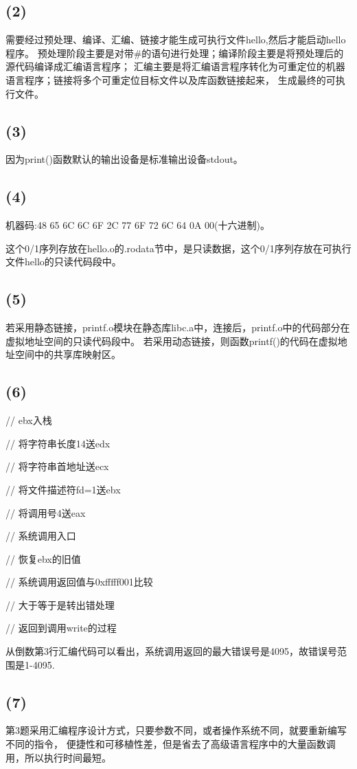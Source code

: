 \documentclass{article}
\begin{document}
\subsection*{(2)}
需要经过预处理、编译、汇编、链接才能生成可执行文件hello,然后才能启动hello程序。
预处理阶段主要是对带\#的语句进行处理；编译阶段主要是将预处理后的源代码编译成汇编语言程序；
汇编主要是将汇编语言程序转化为可重定位的机器语言程序；链接将多个可重定位目标文件以及库函数链接起来，
生成最终的可执行文件。
\subsection*{(3)}
因为print()函数默认的输出设备是标准输出设备stdout。
\subsection*{(4)}
机器码:48 65 6C 6C 6F 2C 77 6F 72 6C 64 0A 00(十六进制)。

这个0/1序列存放在hello.o的.rodata节中，是只读数据，这个0/1序列存放在可执行文件hello的只读代码段中。
\subsection*{(5)}
若采用静态链接，printf.o模块在静态库libc.a中，连接后，printf.o中的代码部分在虚拟地址空间的只读代码段中。
若采用动态链接，则函数printf()的代码在虚拟地址空间中的共享库映射区。
\subsection*{(6)}
// ebx入栈

// 将字符串长度14送edx

// 将字符串首地址送ecx

// 将文件描述符fd=1送ebx

// 将调用号4送eax

// 系统调用入口

// 恢复ebx的旧值

// 系统调用返回值与0xfffff001比较

// 大于等于是转出错处理

// 返回到调用write的过程

从倒数第3行汇编代码可以看出，系统调用返回的最大错误号是4095，故错误号范围是1-4095.
\subsection*{(7)}
第3题采用汇编程序设计方式，只要参数不同，或者操作系统不同，就要重新编写不同的指令，
便捷性和可移植性差，但是省去了高级语言程序中的大量函数调用，所以执行时间最短。
\end{document}
